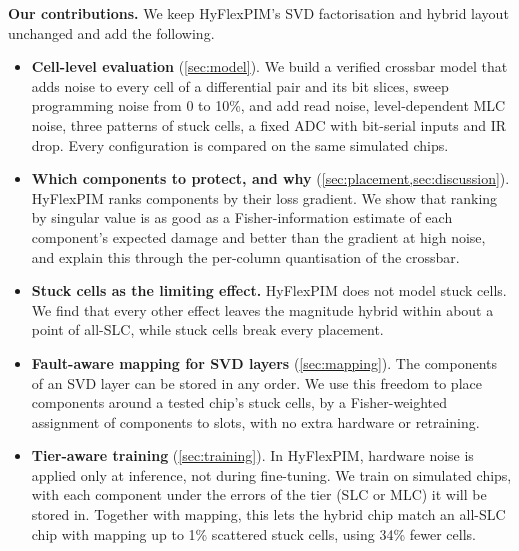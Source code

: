 \textbf{Our contributions.} We keep HyFlexPIM's SVD factorisation and hybrid layout unchanged and add the
following.
\begin{itemize}
\item \textbf{Cell-level evaluation} (\cref{sec:model}). We build a verified crossbar model that adds noise to every cell of a differential pair and its bit
slices, sweep programming noise from 0 to 10\%, and add read noise, level-dependent MLC noise, three
patterns of stuck cells, a fixed ADC with bit-serial inputs and IR drop. Every configuration is compared
on the same simulated chips.

\item \textbf{Which components to protect, and why} (\cref{sec:placement,sec:discussion}). HyFlexPIM ranks
components by their loss gradient. We show that ranking by singular value is as good as a
Fisher-information estimate of each component's expected damage and better than the gradient at high
noise, and explain this through the per-column quantisation of the crossbar.

\item \textbf{Stuck cells as the limiting effect.} HyFlexPIM does not model stuck cells. We find that every
other effect leaves the magnitude hybrid within about a point of all-SLC, while stuck cells break every
placement.

\item \textbf{Fault-aware mapping for SVD layers} (\cref{sec:mapping}). The components of an SVD layer can
be stored in any order. We use this freedom to place components around a tested chip's stuck cells, by a
Fisher-weighted assignment of components to slots, with no extra hardware or retraining.

\item \textbf{Tier-aware training} (\cref{sec:training}). In HyFlexPIM, hardware noise is applied only at
inference, not during fine-tuning. We train on simulated chips, with each component under the errors of the tier (SLC or MLC) it
will be stored in. Together with mapping, this lets the hybrid chip match an all-SLC chip with mapping up
to 1\% scattered stuck cells, using 34\% fewer cells.
\end{itemize}
